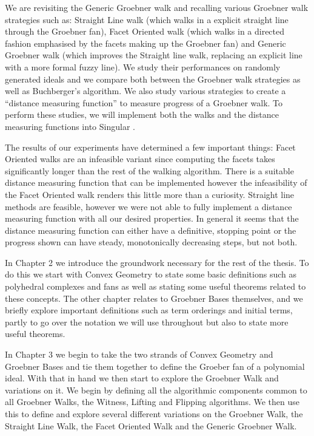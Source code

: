\documentclass[12pt,a4paper]{report}
\begin{document}
We are revisiting the Generic Groebner walk and recalling various Groebner walk strategies such as: Straight Line walk (which walks in a explicit straight line through the Groebner fan), Facet Oriented walk  (which walks in a directed fashion emphasised by the facets making up the Groebner fan) and Generic Groebner walk (which improves the Straight line walk, replacing an explicit line with a more formal fuzzy line). We study their performances on randomly generated ideals and we compare both between the Groebner walk strategies as well as Buchberger's algorithm. We also study various strategies to create a ``distance measuring function'' to measure progress of a Groebner walk. To perform these studies, we will implement both the walks and the distance measuring functions into Singular \cite{DGPS}.

The results of our experiments have determined a few important things: Facet Oriented walks are an infeasible variant since computing the facets takes significantly longer than the rest of the walking algorithm. There is a suitable distance measuring function that can be implemented however the infeasibility of the Facet Oriented walk renders this little more than a curiosity. Straight line methods are feasible, however we were not able to fully implement a distance measuring function with all our desired properties. In general it seems that the distance measuring function can either have a definitive, stopping point or the progress shown can have steady, monotonically decreasing steps, but not both. 

In Chapter 2 we introduce the groundwork necessary for the rest of the thesis. To do this we start with Convex Geometry to state some basic definitions such as polyhedral complexes and fans as well as stating some useful theorems related to these concepts. The other chapter relates to Groebner Bases themselves, and we briefly explore important definitions such as term orderings and initial terms, partly to go over the notation we will use throughout but also to state more useful theorems.

In Chapter 3 we begin to take the two strands of Convex Geometry and Groebner Bases and tie them together to define the Groeber fan of a polynomial ideal. With that in hand we then start to explore the Groebner Walk and variations on it. We begin by defining all the algorithmic components common to all Groebner Walks, the Witness, Lifting and Flipping algorithms. We then use this to define and explore several different variations on the Groebner Walk, the Straight Line Walk, the Facet Oriented Walk and the Generic Groebner Walk.
\end{document}
